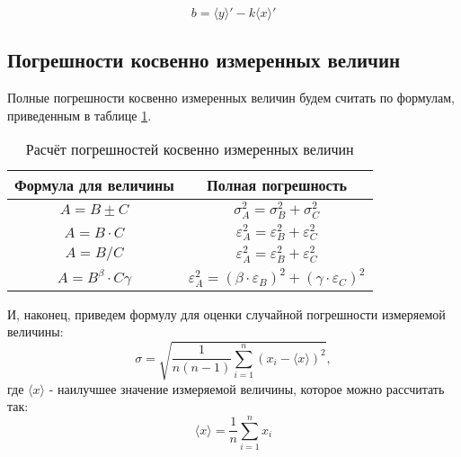 \[
b = \langle y \rangle' - k \langle x \rangle'
\]

\subsection{Погрешности косвенно измеренных величин}

Полные погрешности косвенно измеренных величин будем считать по формулам, приведенным в таблице \ref{pog}.

\begin{table}[h!]
\centering
\caption{Расчёт погрешностей косвенно измеренных величин}
\label{pog}
\begin{tabular}{|c|c|}
\hline
\multicolumn{1}{|c|}{Формула для величины} & Полная погрешность \\ \hline
                    $A = B \pm C$          & $\sigma_A^2 = \sigma_B^2 + \sigma_C^2 $                  \\ \hline
                    $A = B \cdot C$        & $\varepsilon_A^2 = \varepsilon_B^2 + \varepsilon_C^2 $   \\ \hline
                    $A = B / C$            & $\varepsilon_A^2 = \varepsilon_B^2 + \varepsilon_C^2 $   \\ \hline
                    $A = B^\beta \cdot C\gamma$        & $\varepsilon_A^2 = (\beta \cdot \varepsilon_B)^2 + (\gamma \cdot \varepsilon_C)^2 $   \\ \hline
\end{tabular}
\end{table}

И, наконец, приведем формулу для оценки случайной погрешности измеряемой величины:
$$
    \sigma = \sqrt{\frac{1}{n(n-1)} \sum \limits_{i = 1}^{n} (x_i - \langle x \rangle)^2},
$$
где $\langle x \rangle$ - наилучшее значение измеряемой величины, которое можно рассчитать так:
$$
    \langle x \rangle = \frac{1}{n} \sum \limits_{i = 1}^{n} x_i
$$




